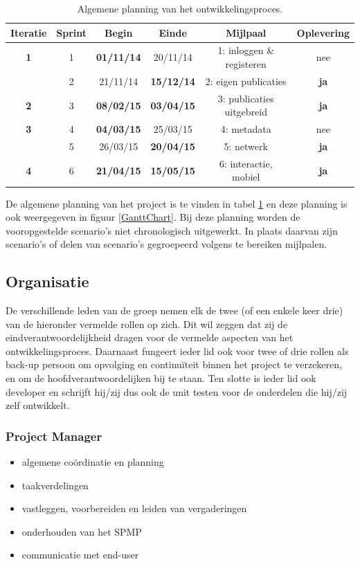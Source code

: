 \documentclass{article}
\begin{document}
\begin{table}[h!]
\begin{center}
\begin{tabular}{||c||c||c||c||c||c||}
	\hline
	\bf{Iteratie} & \bf{Sprint}  & \bf{Begin}  & \bf{Einde}  & \bf{Mijlpaal}   & \bf{Oplevering}  
	\\
	\hline
	\bf{1} & 1 & \bf{01/11/14} & 20/11/14 & 1: inloggen \& registeren & nee \\
	& 2 & 21/11/14 & \bf{15/12/14} & 2: eigen publicaties & \bf{ja}\\
	\hline
	\bf{2} & 3 & \bf{08/02/15} & \bf{03/04/15} & 3: publicaties  uitgebreid & \bf{ja} 	\\
	\hline
	\bf{3} & 4 & \bf{04/03/15} & 25/03/15 & 4: metadata & nee \\
	& 5 & 26/03/15 & \bf{20/04/15} & 5: netwerk & \bf{ja} \\
	\hline
	\bf{4} & 6 & \bf{21/04/15} & \bf{15/05/15} & 6: interactie, mobiel & \bf{ja} 	\\
	\hline
\end{tabular}
 \end{center}
 \caption{Algemene planning van het ontwikkelingsproces.}
 \label{planning}
 \end{table}
 
De algemene planning van het project is te vinden in tabel \ref{planning} en deze planning is ook weergegeven in figuur \ref{GanttChart}. Bij deze planning worden de vooropgestelde scenario's niet chronologisch uitgewerkt. In plaats daarvan zijn scenario's of delen van scenario's gegroepeerd volgens te bereiken mijlpalen.
 

\subsection{Organisatie}

De verschillende leden van de groep nemen elk de twee (of een enkele keer drie) van de hieronder vermelde rollen op zich. Dit wil zeggen dat zij de eindverantwoordelijkheid dragen voor de vermelde aspecten van het ontwikkelingsproces. Daarnaast fungeert ieder lid ook voor twee of drie rollen als back-up persoon om opvolging en continu\"{i}teit binnen het project te verzekeren, en om de hoofdverantwoordelijken bij te staan. Ten slotte is ieder lid ook developer en schrijft hij/zij dus ook de unit testen voor de onderdelen die hij/zij zelf ontwikkelt. 

\subsubsection*{Project Manager}
\begin{itemize}
\item algemene co\"{o}rdinatie en planning
\item taakverdelingen
\item vastleggen, voorbereiden en leiden van vergaderingen
\item onderhouden van het SPMP
\item communicatie met end-user
\end{itemize}
\end{document}
